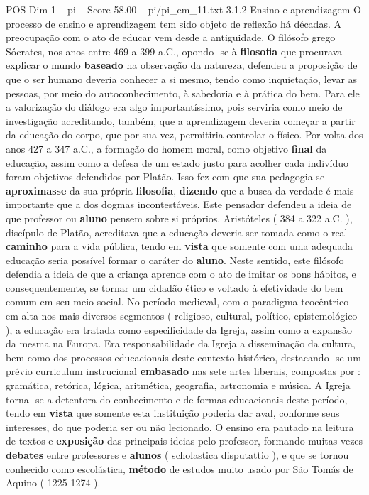 \begin{textsample}{POS Dim 1 – pi – Score 58.00 – pi/pi\_em\_11.txt}  \label{ex:f1_pos_056}
3.1.2 Ensino e aprendizagem O processo de ensino e aprendizagem tem sido objeto de reflexão há décadas.
A preocupação com o ato de educar vem desde a antiguidade.
O filósofo grego Sócrates, nos anos entre 469 a 399 a.C., opondo -se à \textbf{filosofia} que procurava explicar o mundo \textbf{baseado} na observação da natureza, defendeu a proposição de que o ser humano deveria conhecer a si mesmo, tendo como inquietação, levar as pessoas, por meio do autoconhecimento, à sabedoria e à prática do bem.
Para ele a valorização do diálogo era algo importantíssimo, pois serviria como meio de investigação acreditando, também, que a aprendizagem deveria começar a partir da educação do corpo, que por sua vez, permitiria controlar o físico.
Por volta dos anos 427 a 347 a.C., a formação do homem moral, como objetivo \textbf{final} da educação, assim como a defesa de um estado justo para acolher cada indivíduo foram objetivos defendidos por Platão.
Isso fez com que sua pedagogia se \textbf{aproximasse} da sua própria \textbf{filosofia}, \textbf{dizendo} que a busca da verdade é mais importante que a dos dogmas incontestáveis.
Este pensador defendeu a ideia de que professor ou \textbf{aluno} pensem sobre si próprios.
Aristóteles ( 384 a 322 a.C. ), discípulo de Platão, acreditava que a educação deveria ser tomada como o real \textbf{caminho} para a vida pública, tendo em \textbf{vista} que somente com uma adequada educação seria possível formar o caráter do \textbf{aluno}.
Neste sentido, este filósofo defendia a ideia de que a criança aprende com o ato de imitar os bons hábitos, e consequentemente, se tornar um cidadão ético e voltado à efetividade do bem comum em seu meio social.
No período medieval, com o paradigma teocêntrico em alta nos mais diversos segmentos ( religioso, cultural, político, epistemológico ), a educação era tratada como especificidade da Igreja, assim como a expansão da mesma na Europa.
Era responsabilidade da Igreja a disseminação da cultura, bem como dos processos educacionais deste contexto histórico, destacando -se um prévio curriculum instrucional \textbf{embasado} nas sete artes liberais, compostas por : gramática, retórica, lógica, aritmética, geografia, astronomia e música.
A Igreja torna -se a detentora do conhecimento e de formas educacionais deste período, tendo em \textbf{vista} que somente esta instituição poderia dar aval, conforme seus interesses, do que poderia ser ou não lecionado.
O ensino era pautado na leitura de textos e \textbf{exposição} das principais ideias pelo professor, formando muitas vezes \textbf{debates} entre professores e \textbf{alunos} ( scholastica disputattio ), e que se tornou conhecido como escolástica, \textbf{método} de estudos muito usado por São Tomás de Aquino ( 1225-1274 ).

\end{textsample}
